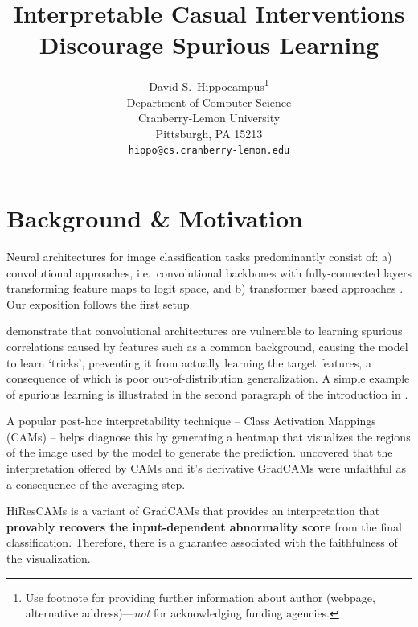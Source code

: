 \documentclass{article}
\title{Interpretable Casual Interventions \\
Discourage Spurious Learning}
\author{%
  David S.~Hippocampus\thanks{Use footnote for providing further information
    about author (webpage, alternative address)---\emph{not} for acknowledging
    funding agencies.} \\
  Department of Computer Science\\
  Cranberry-Lemon University\\
  Pittsburgh, PA 15213 \\
  \texttt{hippo@cs.cranberry-lemon.edu} \\
}
\theoremstyle{plain}
\theoremstyle{definition}
\theoremstyle{remark}
\begin{document}
\maketitle




\section{Background \& Motivation}

Neural architectures for image classification tasks predominantly consist of: a) convolutional approaches, i.e.~convolutional backbones with fully-connected layers transforming feature maps to logit space, and b) transformer based approaches \citep{alexey2020image}. Our exposition follows the first setup.

\cite{singla2022salient} demonstrate that convolutional architectures are vulnerable to learning spurious correlations caused by features such as a common background, causing the model to learn `tricks', preventing it from actually learning the target features, a consequence of which is poor out-of-distribution generalization. A simple example of spurious learning is illustrated in the second paragraph of the introduction in \cite{arjovsky2020invariantriskminimization}.

A popular post-hoc interpretability technique -- Class Activation Mappings (CAMs) \citep{zhou2016learning} -- helps diagnose this by generating a heatmap that visualizes the regions of the image used by the model to generate the prediction. \cite{draelos2020use} uncovered that the interpretation offered by CAMs and it's derivative GradCAMs \citep{selvaraju2017grad} were unfaithful as a consequence of the averaging step.

HiResCAMs \citep{draelos2020use} is a variant of GradCAMs \citep{selvaraju2017grad} that provides an interpretation that \textbf{provably recovers the input-dependent abnormality score} from the final classification. Therefore, there is a guarantee associated with the faithfulness of the visualization.
\end{document}
